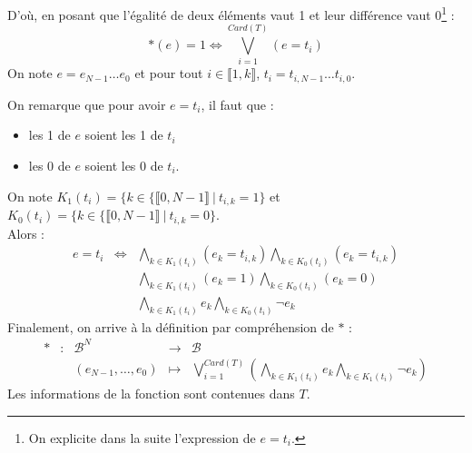 \documentclass[../main.tex]{subfiles}
\begin{document}
D'où, en posant que l'égalité de deux éléments vaut 1 et leur différence vaut 0\footnote{On explicite dans la suite l'expression de $e = t_{i}$.} :
\begin{equation}
	\ast(e) = 1 \Leftrightarrow \displaystyle\bigvee_{i = 1}^{Card(T)}(e = t_i)
\end{equation}
On note $e = e_{N-1}\dots e_{0}$ et pour tout $i\in{\llbracket 1, k\rrbracket}$, $t_{i} = t_{i, N-1}\dots t_{i, 0}$.

On remarque que pour avoir $e = t_{i}$, il faut que :
\begin{itemize}
	\item les 1 de $e$ soient les 1 de $t_{i}$
	\item les 0 de $e$ soient les 0 de $t_{i}$.
\end{itemize}
On note $K_{1}(t_{i}) = \{k\in\{\llbracket 0, N-1\rrbracket\ |\ t_{i, k} = 1\}$ et $K_{0}(t_{i}) = \{k\in\{\llbracket 0, N-1\rrbracket\ |\ t_{i, k} = 0\}$. \\
Alors :
$$
\begin{array}{lcl}
	e = t_i & \Leftrightarrow & \displaystyle\bigwedge_{k\in{K_{1}(t_i)}}(e_k = t_{i, k})\displaystyle\bigwedge_{k\in{K_{0}(t_i)}}(e_k = t_{i, k}) \\
 & & \displaystyle\bigwedge_{k\in{K_{1}(t_i)}}(e_k = 1)\displaystyle\bigwedge_{k\in{K_{0}(t_i)}}(e_k = 0) \\
 & & \displaystyle\bigwedge_{k\in{K_{1}(t_i)}}e_k\displaystyle\bigwedge_{k\in{K_{0}(t_i)}}\neg{e_k}
\end{array}
$$
Finalement, on arrive à la définition par compréhension de $\ast$ :
\begin{displaymath}
\begin{array}{lclcl}
\ast & : & \mathcal{B}^{N} & \rightarrow & \mathcal{B} \\
& & (e_{N-1}, \dots, e_{0}) & \mapsto & \displaystyle\bigvee_{i = 1}^{Card(T)}\left(\displaystyle\bigwedge_{k\in{K_{1}(t_i)}}e_k\displaystyle\bigwedge_{k\in{K_{1}(t_i)}}\neg{e_k}\right)
\end{array}
\end{displaymath}
Les informations de la fonction sont contenues dans $T$.
\end{document}
